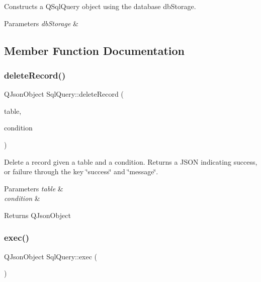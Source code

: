 Constructs a Q\+Sql\+Query object using the database db\+Storage. 


\begin{DoxyParams}{Parameters}
{\em db\+Storage} & \\
\hline
\end{DoxyParams}


\subsection{Member Function Documentation}
\mbox{\label{class_sql_query_a5bf880f51ea330bbccc5815fac1430f2}} 
\subsubsection{\texorpdfstring{delete\+Record()}{deleteRecord()}}
{\footnotesize\ttfamily Q\+Json\+Object Sql\+Query\+::delete\+Record (\begin{DoxyParamCaption}\item[{const Q\+String \&}]{table,  }\item[{const Q\+String \&}]{condition }\end{DoxyParamCaption})}



Delete a record given a table and a condition. Returns a J\+S\+ON indicating success, or failure through the key \char`\"{}success\char`\"{} and \char`\"{}message\char`\"{}. 


\begin{DoxyParams}{Parameters}
{\em table} & \\
\hline
{\em condition} & \\
\hline
\end{DoxyParams}
\begin{DoxyReturn}{Returns}
Q\+Json\+Object 
\end{DoxyReturn}
\mbox{\label{class_sql_query_a2e52ed76e3683d7684fd792bec0b9a09}} 
\subsubsection{\texorpdfstring{exec()}{exec()}\hspace{0.1cm}{\footnotesize\ttfamily [1/2]}}
{\footnotesize\ttfamily Q\+Json\+Object Sql\+Query\+::exec (\begin{DoxyParamCaption}{ }\end{DoxyParamCaption})}




